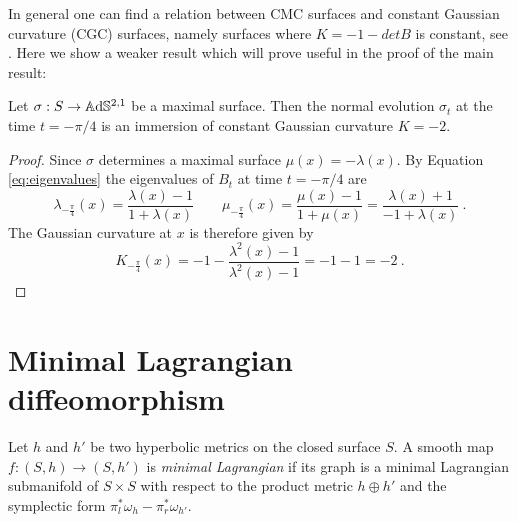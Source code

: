 In general one can find a relation between CMC surfaces and constant Gaussian curvature (CGC) surfaces, namely surfaces where $K = -1 - detB$ is constant, see \cite{chen2017constantmeancurvaturefoliation}. Here we show a weaker result which will prove useful in the proof of the main result:
\begin{proposition} \label{prop:cmc to cgc}
    Let $\sigma: S \to\mathbb{A}\mathrm{d}\mathbb{S}^{2,1}$ be a maximal surface. Then the normal evolution $\sigma_{t}$ at the time $t= -\pi / 4$ is an immersion of constant Gaussian curvature $K = -2$.
\end{proposition}
\begin{proof}
    Since $\sigma$ determines a maximal surface $\mu(x) = - \lambda(x)$. By Equation \ref{eq:eigenvalues} the eigenvalues of $B_t$ at time $t=-\pi / 4$ are
    \[
        \lambda_{-\frac{\pi}{4}}(x) = \frac{\lambda(x) -1}{1 +\lambda(x)} \qquad \mu_{-\frac{\pi}{4}}(x) = \frac{\mu(x)-1}{1 + \mu(x)} = \frac{\lambda(x) + 1}{-1 + \lambda(x)} \ .
    \]
    The Gaussian curvature at $x$ is therefore given by
    \[
        K_{-\frac{\pi}{4}}(x) = - 1 - \frac{ \lambda^2(x) -1}{ \lambda^2(x) -1 } = -1 -1 = -2 \ .
    \]
\end{proof}

\section{Minimal Lagrangian diffeomorphism}

\begin{definition}
    Let $h$ and $h'$ be two hyperbolic metrics on the closed surface $S$. A smooth map $f: (S,h) \to (S,h')$ is \textit{minimal Lagrangian} if its graph is a minimal Lagrangian submanifold of $S\times S$ with respect to the product metric $h \oplus h'$ and the symplectic form $\pi_l^*\omega_h - \pi_r^* \omega_{h'}$. 
\end{definition}

